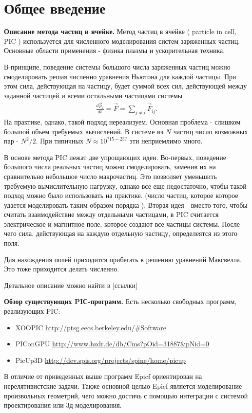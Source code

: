 \section{Общее введение}
\textbf{ Описание метода частиц в ячейке. }
Метод частиц в ячейке ( particle in cell, PIC ) используется для 
численного моделирования систем заряженных частиц. 
Основные области применения - физика плазмы и ускорительная техника.

В-принципе, поведение системы большого числа заряженных 
частиц можно смоделировать решая численно уравнения Ньютона для каждой частицы.
При этом сила, действующая на частицу, будет суммой всех сил,
действующей между заданной частицей и всеми остальными частицами системы
\begin{gather}
  \frac{ d \vec{p}_i }{ dt } = \vec{F} = \sum_{j \neq i} \vec{F}_{ij}.
\end{gather}
На практике, однако, такой подход нереализуем. Основная проблема - слишком
большой объем требуемых вычислений. 
В системе из $N$ частиц число возможных пар - $N^2/2$.
При типичных $N \approx 10^{?15-23?}$ эти неприемлимо много.

В основе метода PIC лежат две упрощающих идеи. 
Во-первых, поведение большого числа реальных частиц можно 
смоделировать, заменив их на сравнительно небольшое число макрочастиц. 
Это позволяет уменьшить требуемую вычислительную нагрузку, однако все еще
недостаточно, чтобы такой подход можно было использовать на практике.
(число частиц, которое которое удается моделировать таким образом порядка  ).
Вторая идея - вместо того, чтобы считать взаимодействие между отдельными 
частицами, в PIC считается электрическое и магнитное поле, которое
создают все частицы системы. После чего сила, действующая на каждую отдельную
частицу, определеятся из этого поля. 

Для нахождения полей приходится прибегать к решению уравнений Максвелла.
Это тоже приходится делать численно. 

Детальное описание можно найти в [ссылки]

\textbf{Обзор существующих PIС-программ.}
Есть несколько свободных программ, реализующих PIC:

\begin{itemize}
\item XOOPIC \url{http://ptsg.eecs.berkeley.edu/#Software}
\item PIConGPU \url{http://www.hzdr.de/db/Cms?pOid=31887&pNid=0}
\item PicUp3D \url{http://dev.spis.org/projects/spine/home/picup}
\end{itemize}

В отличие от приведенных выше программ Epicf ориентирован на нерелятивистские задачи.
Также основной целью Epicf является моделирование произвольных геометрий,
чего можно достичь с помощью интеграции с системой проектирования или 3д-моделирования.


